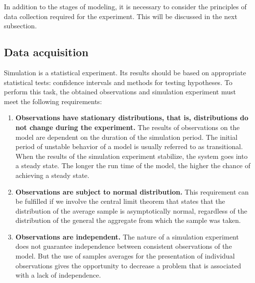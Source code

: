 \documentclass[12pt]{report}
\theoremstyle{definition}
\providecommand{\tightlist}{%
	\setlength{\itemsep}{0pt}\setlength{\parskip}{0pt}}
\begin{document}
In addition to the stages of modeling, it is necessary to consider the principles of data collection required for the experiment. 
This will be discussed in the next subsection.

\subsection{Data acquisition}

Simulation is a statistical experiment.
Its results should be based on appropriate statistical tests: confidence intervals and methods for testing hypotheses.
To perform this task, the obtained observations and simulation experiment must meet the following requirements:

\begin{enumerate}
	\tightlist
	\item \textbf{Observations have stationary distributions, that is, distributions do not change during the experiment.}
	The results of observations on the model are dependent on the duration of the simulation period.
	The initial period of unstable behavior of a model is usually referred to as transitional.
	When the results of the simulation experiment stabilize, the system goes into a steady state.
	The longer the run time of the model, the higher the chance of achieving a steady state.

	\item \textbf{Observations are subject to normal distribution.}
	This requirement can be fulfilled if we involve the central limit theorem that states that the distribution of the average sample is asymptotically normal, regardless of the distribution of the general the aggregate from which the sample was taken.
	
	\item \textbf{Observations are independent.}
	The nature of a simulation experiment does not guarantee independence between consistent observations of the model. 
	But the use of samples averages for the presentation of individual observations gives the opportunity to decrease a problem that is associated with a lack of independence.
\end{enumerate}
\end{document}
